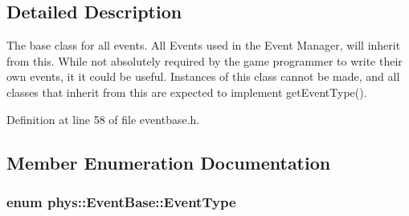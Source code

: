 \subsection{Detailed Description}
The base class for all events. All Events used in the Event Manager, will inherit from this. While not absolutely required by the game programmer to write their own events, it it could be useful. Instances of this class cannot be made, and all classes that inherit from this are expected to implement getEventType(). 

Definition at line 58 of file eventbase.h.



\subsection{Member Enumeration Documentation}
\hypertarget{classphys_1_1EventBase_a5e6a8564e127f654123f0bf6a2751923}{
\subsubsection[{EventType}]{\setlength{\rightskip}{0pt plus 5cm}enum {\bf phys::EventBase::EventType}}}
\label{dd/d80/classphys_1_1EventBase_a5e6a8564e127f654123f0bf6a2751923}
